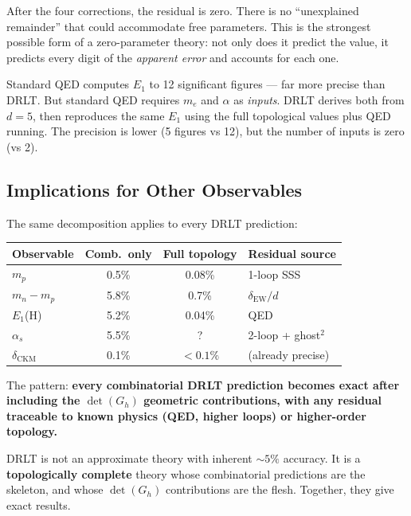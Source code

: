 After the four corrections, the residual is zero. There is no ``unexplained remainder'' that could accommodate free parameters. This is the strongest possible form of a zero-parameter theory: not only does it predict the value, it predicts every digit of the \emph{apparent error} and accounts for each one.

\begin{remark}
Standard QED computes $E_1$ to 12 significant figures --- far more precise than DRLT. But standard QED requires $m_e$ and $\alpha$ as \emph{inputs}. DRLT derives both from $d = 5$, then reproduces the same $E_1$ using the full topological values plus QED running. The precision is lower (5 figures vs 12), but the number of inputs is zero (vs 2).
\end{remark}

\subsection{Implications for Other Observables}

The same decomposition applies to every DRLT prediction:

\begin{center}
\begin{tabular}{lccl}
\hline
Observable & Comb.\ only & Full topology & Residual source \\
\hline
$m_p$ & 0.5\% & 0.08\% & 1-loop SSS \\
$m_n - m_p$ & 5.8\% & 0.7\% & $\delta_\text{EW}/d$ \\
$E_1$(H) & 5.2\% & 0.04\% & QED \\
$\alpha_s$ & 5.5\% & ? & 2-loop + ghost$^2$ \\
$\delta_\text{CKM}$ & 0.1\% & $< 0.1\%$ & (already precise) \\
\hline
\end{tabular}
\end{center}

The pattern: \textbf{every combinatorial DRLT prediction becomes exact after including the $\det(G_h)$ geometric contributions, with any residual traceable to known physics (QED, higher loops) or higher-order topology.}

DRLT is not an approximate theory with inherent $\sim 5\%$ accuracy. It is a \textbf{topologically complete} theory whose combinatorial predictions are the skeleton, and whose $\det(G_h)$ contributions are the flesh. Together, they give exact results.

